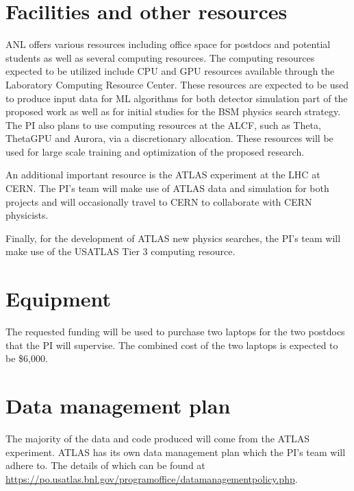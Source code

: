 \documentclass[letter, USenglish, 11pt, subfigure]{article}
\begin{document}
\printbibliography
\clearpage

\section{Facilities and  other resources}
ANL offers various resources including office space for postdocs and potential students as well as several computing resources. The computing resources expected to be utilized include CPU and GPU resources available through the Laboratory Computing Resource Center. These resources are expected to be used to produce input data for ML algorithms for both detector simulation part of the proposed work as well as for initial studies for the BSM physics search strategy. The PI also plans to use computing resources at the ALCF, such as Theta, ThetaGPU and Aurora, via a discretionary allocation. These resources will be used for large scale training and optimization of the proposed research.

An additional important resource is the ATLAS experiment at the LHC at CERN. The PI's team will make use of ATLAS data and simulation for both projects and will occasionally travel to CERN to collaborate with CERN physicists.

Finally, for the development of ATLAS new physics searches, the PI's team will make use of the USATLAS Tier 3 computing resource.

\clearpage

\section{Equipment}
The requested funding will be used to purchase two laptops for the two postdocs that the PI will supervise. The combined cost of the two laptops is expected to be \$6,000.%
\clearpage

\section{Data management plan}
The majority of the data and code produced will come from the ATLAS experiment. ATLAS has its own data management plan which the PI's team will adhere to. The details of which can be found at \url{https://po.usatlas.bnl.gov/programoffice/datamanagementpolicy.php}.
\end{document}
